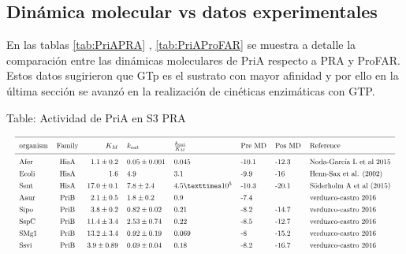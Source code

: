 \documentclass[12pt,twoside]{reedthesis}
\begin{document}
{  \clearpage  
  
  \subsection{Dinámica molecular vs datos
  experimentales}\label{dinamica-molecular-vs-datos-experimentales}
  
  En las tablas \autoref{tab:PriAPRA} , \autoref{tab:PriAProFAR} se
  muestra a detalle la comparación entre las dinámicas moleculares de PriA
  respecto a PRA y ProFAR. Estos datos sugirieron que GTp es el sustrato
  con mayor afinidad y por ello en la última sección se avanzó en la
  realización de cinéticas enzimáticas con GTP.
  
  Table: Actividad de PriA en S3 PRA \label{tab:PriAPRA}
  
  \[ 
  \resizebox{\columnwidth}{!}{%
  \begin{tabular}{ l c r l l l l l}
  \hline \\ [-1.5ex]
  organism  &Family & $K_M    $     & $k_{cat}$        & $\frac{k_{cat}}{K_M}$ &Pre MD & Pos MD & Reference  \\ [1ex]
  \hline \\ [-1.5ex]
  Afer        &HisA   & $1.1\pm0.2$   &$  0.05\pm0.001    $& 0.045                  &-10.1    &-12.3       &Noda-García L et al 2015\\ [1ex]
  Ecoli       &HisA   &$  1.6         $&$         4.9       $&3.1                   &-9.9   &-16       &Henn-Sax et al. (2002)\\ [1ex]
  Sent        &HisA   &$  17.0 \pm0.1 $&$ 7.8 \pm 2.4   $&$4.5 × 10^5          $&-10.3  &-20.1     &Söderholm A et al (2015)\\ [1ex]
  Aaur        &PriB   &$  2.1 \pm 0.5 $& $    1.8 \pm 0.2     $&0.9                   &-7.4   &              &verduzco-castro 2016\\ [1ex]
  Sipo        &PriB   &$  3.8\pm0.2     $&$0.82\pm0.02        $&0.21                  &-8.2     &-14.7       &verduzco-castro 2016\\ [1ex]
  SspC        &PriB   &$  11.4\pm3.4  $&$2.53\pm0.74      $&0.22                  &   -8.5    &-12.7     &verduzco-castro 2016\\ [1ex]
  SMg1        &PriB   &$  13.2\pm3.4  $&$0.92\pm0.19      $&0.069                 &-8     &-15.2     &verduzco-castro 2016\\ [1ex]
  Ssvi        &PriB   &$  3.9\pm0.89  $&$0.69\pm0.04      $&0.18                  &-8.2     &-16.7     &verduzco-castro 2016\\ [1ex]

\end{tabular}}\]}
\end{document}
